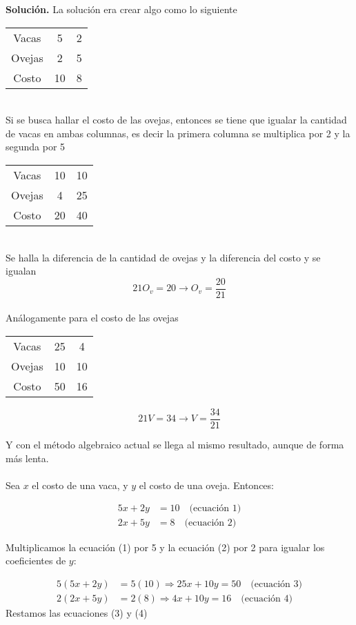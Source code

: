 \textbf{Solución.} La solución era crear algo como lo siguiente\\
\begin{tabular}{c|cc|}
    Vacas  & 5 & 2 \\
    Ovejas  & 2 & 5 \\
    Costo  & 10 & 8\\
\end{tabular}
\\Si se busca hallar el costo de las ovejas, entonces se tiene que igualar la cantidad de vacas en ambas columnas, es decir la primera columna se multiplica por 2 y la segunda por 5\\
\begin{tabular}{c|cc|}
    Vacas  & 10 & 10 \\
    Ovejas  & 4 & 25 \\
    Costo  & 20 & 40\\
\end{tabular}
\\Se halla la diferencia de la cantidad de ovejas y la diferencia del costo y se igualan
\[
    21O_{v} = 20 \rightarrow O_{v} = \frac{20}{21}
\]
\\Análogamente para el costo de las ovejas\\
\begin{tabular}{c|cc|}
    Vacas  & 25 & 4 \\
    Ovejas  & 10 & 10 \\
    Costo  & 50 & 16\\
\end{tabular}
\[
    21V = 34 \rightarrow V = \frac{34}{21}
\]

Y con el método algebraico actual se llega al mismo resultado, aunque de forma más lenta.\\\\
Sea $x$ el costo de una vaca, y $y$ el costo de una oveja. Entonces:

\begin{align*}
5x + 2y &= 10 \quad \text{(ecuación 1)} \\
2x + 5y &= 8  \quad \text{(ecuación 2)}
\end{align*}

Multiplicamos la ecuación (1) por 5 y la ecuación (2) por 2 para igualar los coeficientes de $y$:

\begin{align*}
5(5x + 2y) &= 5(10) \Rightarrow 25x + 10y = 50 \quad \text{(ecuación 3)} \\
2(2x + 5y) &= 2(8) \Rightarrow 4x + 10y = 16 \quad \text{(ecuación 4)}
\end{align*}
Restamos las ecuaciones (3) y (4)

